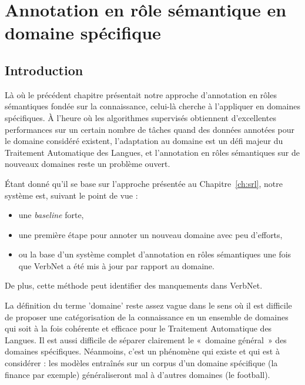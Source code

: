 

\chapter{Annotation en rôle sémantique en domaine spécifique}
\label{ch:domainsrl}

\section{Introduction}

Là où le précédent chapitre présentait notre approche d'annotation en rôles
sémantiques fondée sur la connaissance, celui-là cherche à l'appliquer en
domaines spécifiques. À l'heure où les algorithmes supervisés obtiennent
d'excellentes performances sur un certain nombre de tâches quand des données
annotées pour le domaine considéré existent, l'adaptation au domaine est un
défi majeur du Traitement Automatique des Langues, et l'annotation en rôles
sémantiques sur de nouveaux domaines reste un problème ouvert. 

Étant donné qu'il se base sur l'approche présentée au Chapitre~\ref{ch:srl},
notre système est, suivant le point de vue :
\begin{itemize}
    \item une \emph{baseline} forte,
    \item une première étape pour annoter un nouveau domaine avec peu d'efforts,
    \item ou la base d'un système complet d'annotation en rôles sémantiques une fois que VerbNet a
été mis à jour par rapport au domaine.
\end{itemize}

De plus, cette méthode peut identifier des manquements dans VerbNet.

La définition du terme 'domaine' reste assez vague dans le sens où il est
difficile de proposer une catégorisation de la connaissance en un ensemble de
domaines qui soit à la fois cohérente et efficace pour le Traitement
Automatique des Langues. Il est aussi difficile de séparer clairement le
«~domaine général~» des domaines spécifiques. Néanmoins, c'est un phénomène qui
existe et qui est à considérer : les modèles entraînés sur un corpus d'un
domaine spécifique (la finance par exemple) généraliseront mal à d'autres
domaines (le football).



